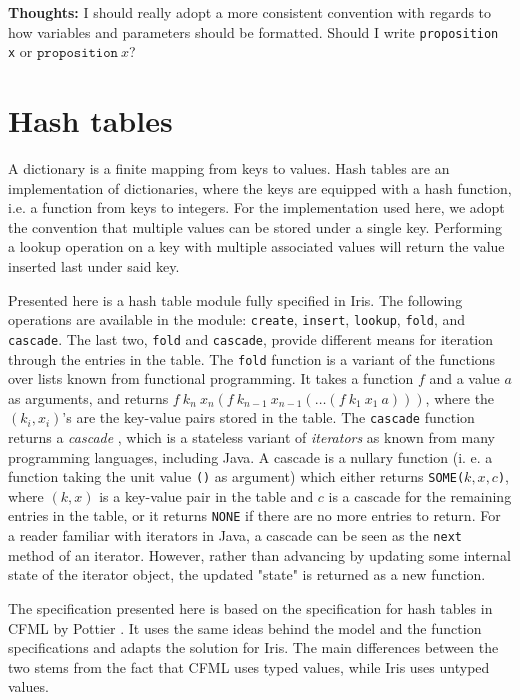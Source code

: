 \documentclass[10pt,a4paper]{article}
\renewcommand{\fcolorbox}[4][]{#4}}
\newcommand{\thoughts}[1]{\noindent\fcolorbox{black}{cyan}{\parbox{\textwidth}{\textbf{Thoughts:} \linebreak #1}}}
\begin{document}
\thoughts{I should really adopt a more consistent convention with regards to how variables and parameters should be formatted. Should I write \texttt{proposition x} or $\mathtt{proposition} \ x$?}
\section{Hash tables}
A dictionary is a finite mapping from keys to values. Hash tables are an implementation of dictionaries, where the keys are equipped with a hash function, i.e. a function from keys to integers. For the implementation used here, we adopt the convention that multiple values can be stored under a single key. Performing a lookup operation on a key with multiple associated values will return the value inserted last under said key.

Presented here is a hash table module fully specified in Iris. The following operations are available in the module: \texttt{create}, \texttt{insert}, \texttt{lookup}, \texttt{fold}, and \texttt{cascade}. The last two, \texttt{fold} and \texttt{cascade}, provide different means for iteration through the entries in the table. The \texttt{fold} function is a variant of the functions over lists known from functional programming. It takes a function $f$ and a value $a$ as arguments, and returns $f \ k_n \ x_n (f \ k_{n-1} \ x_{n-1} (\ldots (f \ k_1 \ x_1 \ a)))$, where the $(k_i, x_i)$'s are the key-value pairs stored in the table. The \texttt{cascade} function returns a \emph{cascade} \cite{pottier-cpp-17}, which is a stateless variant of \emph{iterators} \cite{Gamma:1995:DPE:186897} as known from many programming languages, including Java. A cascade is a nullary function (i. e. a function taking the unit value \texttt{()} as argument) which either returns \texttt{SOME($k,x,c$)}, where $(k,x)$ is a key-value pair in the table and $c$ is a cascade for the remaining entries in the table, or it returns \texttt{NONE} if there are no more entries to return. For a reader familiar with iterators in Java, a cascade can be seen as the \texttt{next} method of an iterator. However, rather than advancing by updating some internal state of the iterator object, the updated "state" is returned as a new function.

The specification presented here is based on the specification for hash tables in CFML by Pottier \cite{pottier-cpp-17}. It uses the same ideas behind the model and the function specifications and adapts the solution for Iris. The main differences between the two stems from the fact that CFML uses typed values, while Iris uses untyped values.
\end{document}
